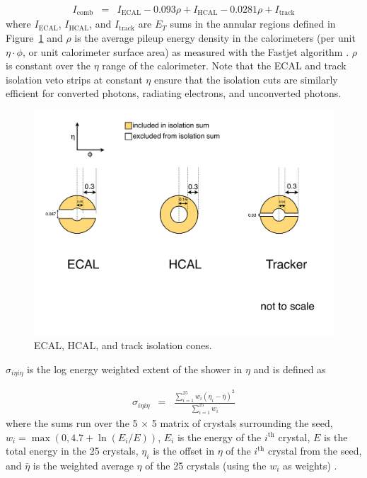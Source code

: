 \documentclass[dissertation.tex]{subfiles}
\begin{document}
\begin{eqnarray}
I_{\mathrm{comb}} &=& I_{\mathrm{ECAL}} - 0.093\rho + I_{\mathrm{HCAL}} - 0.0281\rho + I_{\mathrm{track}}
\end{eqnarray}
%
where $I_{\mathrm{ECAL}}$, $I_{\mathrm{HCAL}}$, and $I_{\mathrm{track}}$ are $E_{T}$ sums in the annular regions defined in Figure~\ref{fig:isolation_cones} and $\rho$ is the average pileup energy density in the calorimeters (per unit $\eta\cdot\phi$, or unit calorimeter surface area) as measured with the Fastjet algorithm \cite{Fastjet_conf_proceedings, Fastjet_manual}.  $\rho$ is constant over the $\eta$ range of the calorimeter.  Note that the ECAL and track isolation veto strips at constant $\eta$ ensure that the isolation cuts are similarly efficient for converted photons, radiating electrons, and unconverted photons.

\begin{figure}
	\centering
	\includegraphics[scale=0.4]{isolation_cones}
	\caption{ECAL, HCAL, and track isolation cones.}
	\label{fig:isolation_cones}
\end{figure}

$\sigma_{i\eta i\eta}$ is the log energy weighted extent of the shower in $\eta$ and is defined as

\begin{eqnarray}
\sigma_{i\eta i\eta} &=& \frac{\sum_{i = 1}^{25}w_{i}(\eta_{i} - \bar{\eta})^{2}}{\sum_{i = 1}^{25}w_{i}}
\end{eqnarray}
%
where the sums run over the 5 $\times$ 5 matrix of crystals surrounding the seed, $w_{i} = \max(0, 4.7 + \ln(E_{i}/E))$, $E_{i}$ is the energy of the $i^{\mathrm{th}}$ crystal, $E$ is the total energy in the 25 crystals, $\eta_{i}$ is the offset in $\eta$ of the $i^{\mathrm{th}}$ crystal from the seed, and $\bar{\eta}$ is the weighted average $\eta$ of the 25 crystals (using the $w_{i}$ as weights) \cite{CMS-QCD-10-019}.
\end{document}
